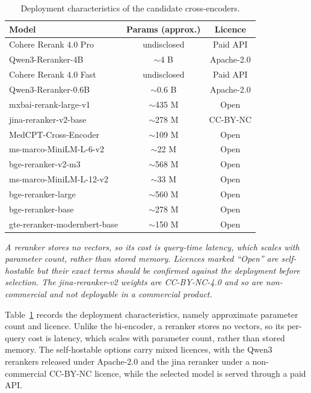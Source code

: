 \begin{table}[t]
\caption{Deployment characteristics of the candidate cross-encoders.}
\label{tab:xenc-deploy}
\centering
\footnotesize
\begin{tabular}{@{}lcc@{}}
\toprule
Model & Params (approx.) & Licence \\
\midrule
Cohere Rerank 4.0 Pro & undisclosed & Paid API \\
Qwen3-Reranker-4B & $\sim$4 B & Apache-2.0 \\
Cohere Rerank 4.0 Fast & undisclosed & Paid API \\
Qwen3-Reranker-0.6B & $\sim$0.6 B & Apache-2.0 \\
mxbai-rerank-large-v1 & $\sim$435 M & Open \\
jina-reranker-v2-base & $\sim$278 M & CC-BY-NC \\
MedCPT-Cross-Encoder & $\sim$109 M & Open \\
ms-marco-MiniLM-L-6-v2 & $\sim$22 M & Open \\
bge-reranker-v2-m3 & $\sim$568 M & Open \\
ms-marco-MiniLM-L-12-v2 & $\sim$33 M & Open \\
bge-reranker-large & $\sim$560 M & Open \\
bge-reranker-base & $\sim$278 M & Open \\
gte-reranker-modernbert-base & $\sim$150 M & Open \\
\bottomrule
\end{tabular}

\vspace{3pt}
\begin{minipage}{\linewidth}
\footnotesize\itshape
A reranker stores no vectors, so its cost is query-time latency, which scales with parameter count, rather than stored memory. Licences marked ``Open'' are self-hostable but their exact terms should be confirmed against the deployment before selection. The jina-reranker-v2 weights are CC-BY-NC-4.0 and so are non-commercial and not deployable in a commercial product.
\end{minipage}
\end{table}

Table~\ref{tab:xenc-deploy} records the deployment characteristics, namely approximate parameter count and licence. Unlike the bi-encoder, a reranker stores no vectors, so its per-query cost is latency, which scales with parameter count, rather than stored memory. The self-hostable options carry mixed licences, with the Qwen3 rerankers released under Apache-2.0 and the jina reranker under a non-commercial CC-BY-NC licence, while the selected model is served through a paid API.

